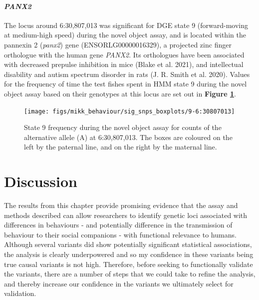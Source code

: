 \documentclass[
]{book}
\begin{document}
\hypertarget{panx2}{%
\paragraph{\texorpdfstring{\emph{PANX2}}{PANX2}}\label{panx2}}

The locus around 6:30,807,013 was significant for DGE state 9 (forward-moving at medium-high speed) during the novel object assay, and is located within the pannexin 2 (\emph{panx2}) gene (ENSORLG00000016329), a projected zinc finger orthologue with the human gene \emph{PANX2}. Its orthologues have been associated with decreased prepulse inhibition in mice (Blake et al. 2021), and intellectual disability and autism spectrum disorder in rats (J. R. Smith et al. 2020). Values for the frequency of time the test fishes spent in HMM state 9 during the novel object assay based on their genotypes at this locus are set out in \textbf{Figure \ref{fig:sig-snp-6-30mb}}.



\begin{figure}
\texttt{[image: figs/mikk\_behaviour/sig\_snps\_boxplots/9-6:30807013]} \caption{State 9 frequency during the novel object assay for counts of the alternative allele (A) at 6:30,807,013. The boxes are coloured on the left by the paternal line, and on the right by the maternal line.}\label{fig:sig-snp-6-30mb}
\end{figure}

\hypertarget{discussion-2}{%
\section{Discussion}\label{discussion-2}}

The results from this chapter provide promising evidence that the assay and methods described can allow researchers to identify genetic loci associated with differences in behaviours - and potentially difference in the transmission of behaviour to their social companions - with functional relevance to humans. Although several variants did show potentially significant statistical associations, the analysis is clearly underpowered and so my confidence in these variants being true causal variants is not high. Therefore, before seeking to functionally validate the variants, there are a number of steps that we could take to refine the analysis, and thereby increase our confidence in the variants we ultimately select for validation.
\end{document}
